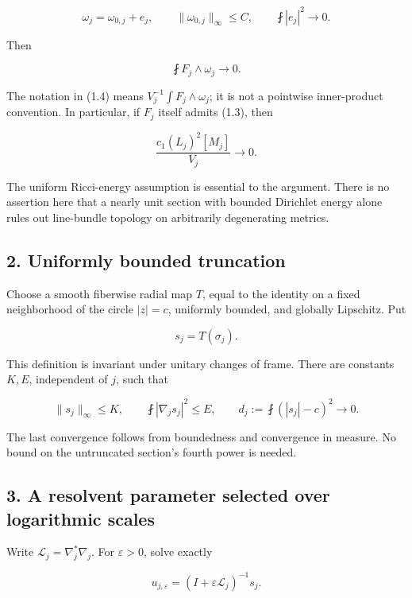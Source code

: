 \documentclass[11pt]{article}
\begin{document}
\[
\omega_j=\omega_{0,j}+e_j,
\qquad \|\omega_{0,j}\|_\infty\le C,
\qquad \fint|e_j|^2\longrightarrow0.
\tag{D.1.3}
\]

Then

\[
\boxed{\fint F_j\wedge\omega_j\longrightarrow0.}
\tag{D.1.4}
\]

The notation in (1.4) means \(V_j^{-1}\int F_j\wedge\omega_j\); it is
not a pointwise inner-product convention. In particular, if \(F_j\)
itself admits (1.3), then

\[
\boxed{\frac{c_1(L_j)^2[M_j]}{V_j}\longrightarrow0.}
\tag{D.1.5}
\]

The uniform Ricci-energy assumption is essential to the argument. There
is no assertion here that a nearly unit section with bounded Dirichlet
energy alone rules out line-bundle topology on arbitrarily degenerating
metrics.

\hypertarget{uniformly-bounded-truncation}{%
\subsection{2. Uniformly bounded
truncation}\label{uniformly-bounded-truncation}}

Choose a smooth fiberwise radial map \(T\), equal to the identity on a
fixed neighborhood of the circle \(|z|=c\), uniformly bounded, and
globally Lipschitz. Put

\[
s_j=T(\sigma_j).
\]

This definition is invariant under unitary changes of frame. There are
constants \(K,E\), independent of \(j\), such that

\[
\|s_j\|_\infty\le K,\qquad
\fint|\nabla_j s_j|^2\le E,
\qquad d_j:=\fint (|s_j|-c)^2\longrightarrow0.
\tag{D.2.1}
\]

The last convergence follows from boundedness and convergence in
measure. No bound on the untruncated section's fourth power is needed.

\hypertarget{a-resolvent-parameter-selected-over-logarithmic-scales}{%
\subsection{3. A resolvent parameter selected over logarithmic
scales}\label{a-resolvent-parameter-selected-over-logarithmic-scales}}

Write \(\mathcal L_j=\nabla_j^*\nabla_j\). For \(\varepsilon>0\), solve
exactly

\[
u_{j,\varepsilon}=(I+\varepsilon\mathcal L_j)^{-1}s_j.
\tag{D.3.1}
\]
\end{document}
